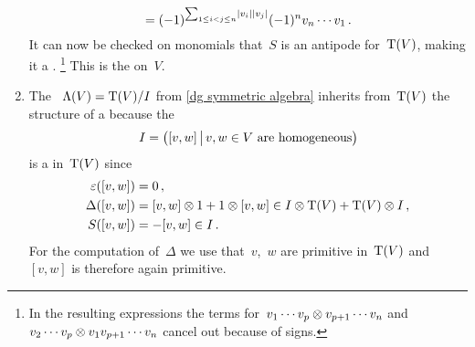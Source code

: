 \documentclass[a4paper,10pt,headings=standardclasses]{scrartcl}
\begin{document}
\begin{example}
\begin{enumerate}
\[        =
        (-1)^{\sum_{1 \leq i < j \leq n} \lvert v_i\rvert \lvert v_j\rvert}
        (-1)^n
        v_n \dotsm v_1  \,.
      \]%
      It can now be checked on monomials that~$S$ is an antipode for~$\operatorname{T}(V)$, making it a {\dgh}.%
      \footnote{In the resulting expressions the terms for~$v_1 \dotsm v_p \otimes v_{p+1} \dotsm v_n$ and~$v_2 \dotsm v_p \otimes v_1 v_{p+1} \dotsm v_n$ cancel out because of signs.}
      This is the  on~$V$.
    \item
      The {\dga}~$\operatorname{\Lambda}(V) = \operatorname{T}(V)/I$ from \cref{dg symmetric algebra} inherits from~$\operatorname{T}(V)$ the structure of a {\dgh} because the~{\dgi}
      \[
        I
        =
        \bigl(
          [v,w]
        \suchthat[\big]
          \text{$v,w \in V$ are homogeneous}
        \bigr)
      \]
      is a {\dghi} in~$\operatorname{T}(V)$ since
      \begin{align*}
        \varepsilon([v,w])
        &=
        0 \,,
      \\
        \Delta([v,w])
        &=
        [v,w] \otimes 1 + 1 \otimes [v,w]
        \in
        I \otimes \operatorname{T}(V) + \operatorname{T}(V) \otimes I \,,
      \\
        S([v,w])
        &=
        -[v,w]
        \in
        I \,.
      \end{align*}
      For the computation of~$\Delta$ we use that~$v$,~$w$ are primitive in~$\operatorname{T}(V)$ and~$[v,w]$ is therefore again primitive.
  \end{enumerate}
\end{example}
\end{document}
